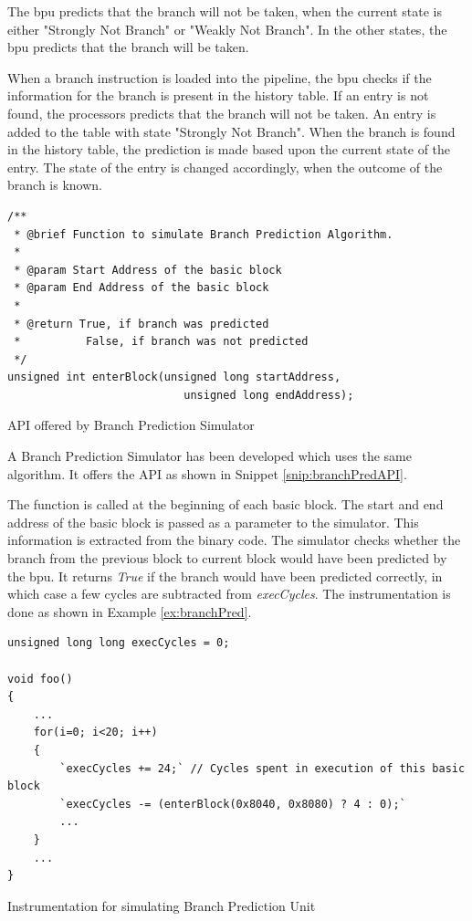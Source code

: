 The \gls{bpu} predicts that the branch will not be taken, when the current state is either "Strongly Not Branch" or "Weakly Not Branch". In the other states, the \gls{bpu} predicts that the branch will be taken.

When a branch instruction is loaded into the pipeline, the \gls{bpu} checks if the information for the branch is present in the history table. If an entry is not found, the processors predicts that the branch will not be taken. An entry is added to the table with state "Strongly Not Branch". When the branch is found in the history table, the prediction is made based upon the current state of the entry. The state of the entry is changed accordingly, when the outcome of the branch is known.

\begin{Snippet}[h!]
\begin{lstlisting}
/**
 * @brief Function to simulate Branch Prediction Algorithm.
 *
 * @param Start Address of the basic block
 * @param End Address of the basic block
 *
 * @return True, if branch was predicted
 *          False, if branch was not predicted
 */
unsigned int enterBlock(unsigned long startAddress,
                           unsigned long endAddress);
\end{lstlisting}
\caption{API offered by Branch Prediction Simulator}
\label{snip:branchPredAPI}
\end{Snippet}

A Branch Prediction Simulator has been developed which uses the same algorithm. It offers the API as shown in Snippet \ref{snip:branchPredAPI}. 

The function is called at the beginning of each basic block. The start and end address of the basic block is passed as a parameter to the simulator. This information is extracted from the binary code. The simulator checks whether the branch from the previous block to current block would have been predicted by the \gls{bpu}. It returns \emph{True} if the branch would have been predicted correctly, in which case a few cycles are subtracted from \emph{execCycles}. The instrumentation is done as shown in Example \ref{ex:branchPred}.

\begin{Example}[h!]
\begin{lstlisting}
unsigned long long execCycles = 0;

void foo()
{
    ...
    for(i=0; i<20; i++)
    {
        `execCycles += 24;` // Cycles spent in execution of this basic block
        `execCycles -= (enterBlock(0x8040, 0x8080) ? 4 : 0);`
        ...
    }
    ...
}
\end{lstlisting}
\caption{Instrumentation for simulating Branch Prediction Unit}
\label{ex:branchPred}
\end{Example}

